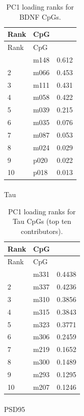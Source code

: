 \documentclass[
  letterpaper,
  DIV=11,
  numbers=noendperiod]{scrartcl}
\makeatletter
\let\oldparagraph\paragraph
\renewcommand{\paragraph}{
    \@ifstar
      \xxxParagraphStar
      \xxxParagraphNoStar
  }
\newcommand{\xxxParagraphStar}[1]{\oldparagraph*{#1}\mbox{}}
\newcommand{\xxxParagraphNoStar}[1]{\oldparagraph{#1}\mbox{}}
\makeatother
\begin{document}
\begin{longtable}[]{@{}llr@{}}
\caption{PC1 loading ranks for BDNF
CpGs.}\label{tbl-supp-pca-bdnf}\tabularnewline
\toprule\noalign{}
Rank & CpG & \\
\midrule\noalign{}
\endfirsthead
\toprule\noalign{}
Rank & CpG & \\
\midrule\noalign{}
\endhead
\bottomrule\noalign{}
\endlastfoot
1 & m148 & 0.612 \\
2 & m066 & 0.453 \\
3 & m111 & 0.431 \\
4 & m058 & 0.422 \\
5 & m039 & 0.215 \\
6 & m035 & 0.076 \\
7 & m087 & 0.053 \\
8 & m024 & 0.029 \\
9 & p020 & 0.022 \\
10 & p018 & 0.013 \\
\end{longtable}

\paragraph{Tau}\label{tau-1}

\begin{longtable}[]{@{}llr@{}}
\caption{PC1 loading ranks for Tau CpGs (top ten
contributors).}\label{tbl-supp-pca-tau}\tabularnewline
\toprule\noalign{}
Rank & CpG & \\
\midrule\noalign{}
\endfirsthead
\toprule\noalign{}
Rank & CpG & \\
\midrule\noalign{}
\endhead
\bottomrule\noalign{}
\endlastfoot
1 & m331 & 0.4438 \\
2 & m337 & 0.4236 \\
3 & m310 & 0.3856 \\
4 & m315 & 0.3843 \\
5 & m323 & 0.3771 \\
6 & m306 & 0.2459 \\
7 & m219 & 0.1652 \\
8 & m300 & 0.1489 \\
9 & m293 & 0.1295 \\
10 & m207 & 0.1246 \\
\end{longtable}

\paragraph{PSD95}\label{psd95-1}
\end{document}
